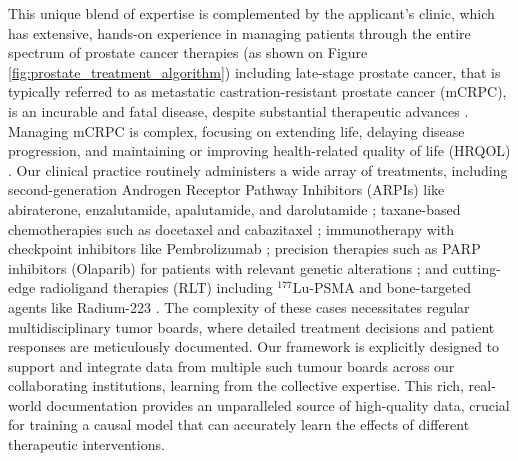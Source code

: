 \documentclass[11pt, a4paper]{article}
\begin{document}

This unique blend of expertise is complemented by the applicant's clinic, which has extensive, hands-on experience in managing patients through the entire spectrum of prostate cancer therapies (as shown on Figure \ref{fig:prostate_treatment_algorithm}) including late-stage prostate cancer, that is  typically referred to as metastatic castration-resistant prostate cancer (mCRPC), is an incurable and fatal disease, despite substantial therapeutic advances \cite{FizaziHerrmann2023, HatanoNonomura2023}. Managing mCRPC is complex, focusing on extending life, delaying disease progression, and maintaining or improving health-related quality of life (HRQOL) \cite{FizaziHerrmann2023}. Our clinical practice routinely administers a wide array of treatments, including second-generation Androgen Receptor Pathway Inhibitors (ARPIs) like abiraterone, enzalutamide, apalutamide, and darolutamide \cite{FizaziHerrmann2023, HatanoNonomura2023, MaLi2022}; taxane-based chemotherapies such as docetaxel and cabazitaxel \cite{FizaziHerrmann2023, HatanoNonomura2023}; immunotherapy with checkpoint inhibitors like Pembrolizumab \cite{MaLi2022, RamnaraignSartor2023}; precision therapies such as PARP inhibitors (Olaparib) for patients with relevant genetic alterations \cite{HatanoNonomura2023, MaLi2022}; and cutting-edge radioligand therapies (RLT) including $^{\text{177}}\text{Lu-PSMA}$ and bone-targeted agents like Radium-223 \cite{FizaziHerrmann2023, ChandranFigg2022, Keam2022}. The complexity of these cases necessitates regular multidisciplinary tumor boards, where detailed treatment decisions and patient responses are meticulously documented. Our framework is explicitly designed to support and integrate data from multiple such tumour boards across our collaborating institutions, learning from the collective expertise. This rich, real-world documentation provides an unparalleled source of high-quality data, crucial for training a causal model that can accurately learn the effects of different therapeutic interventions.

\end{document}
